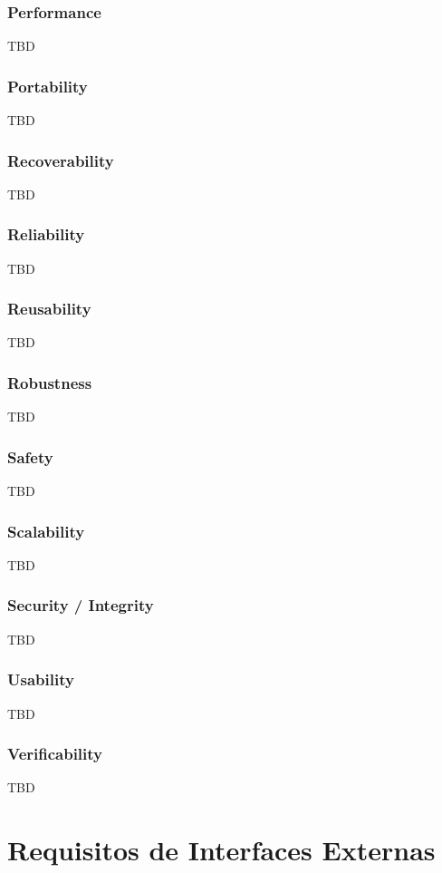        \subsubsection{Performance}
            TBD
        \subsubsection{Portability}
            TBD
        \subsubsection{Recoverability}
            TBD
        \subsubsection{Reliability}
            TBD
        \subsubsection{Reusability}
            TBD
        \subsubsection{Robustness}
            TBD
        \subsubsection{Safety}
            TBD
        \subsubsection{Scalability}
            TBD
        \subsubsection{Security / Integrity}
            TBD
        \subsubsection{Usability}
            TBD
        \subsubsection{Verificability}
            TBD

\section{Requisitos de Interfaces Externas}

